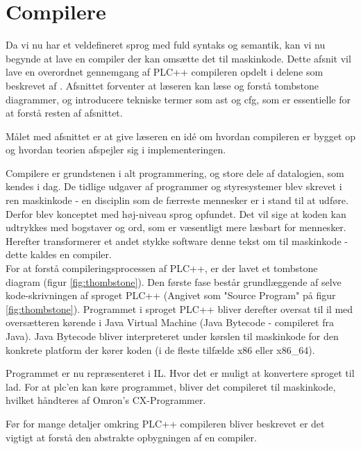 \section{Compilere}
Da vi nu har et veldefineret sprog med fuld syntaks og semantik, kan vi nu begynde at lave en compiler der kan omsætte det til maskinkode. Dette afsnit vil lave en overordnet gennemgang af PLC++ compileren opdelt i delene som beskrevet af \textcite{CraftingCompiler_2009}. 
Afsnittet forventer at læseren kan læse og forstå tombstone diagrammer, og introducere tekniske termer som \acrlong{ast} og \acrlong{cfg}, som er essentielle for at forstå resten af afsnittet. 

Målet med afsnittet er at give læseren en idé om hvordan compileren er bygget op og hvordan teorien afspejler sig i implementeringen.

\bigskip

\noindent Compilere er grundstenen i alt programmering, og store dele af datalogien, som kendes i dag. De tidlige udgaver af programmer og styresystemer blev skrevet i ren maskinkode - en disciplin som de færreste mennesker er i stand til at udføre. Derfor blev konceptet med høj-niveau sprog opfundet. Det vil sige at koden kan udtrykkes med bogstaver og ord, som er væsentligt mere læsbart for mennesker. Herefter transformerer et andet stykke software denne tekst om til maskinkode - dette kaldes en compiler. \\

\noindent For at forstå compileringsprocessen af PLC++, er der lavet et tombstone diagram (figur \ref{fig:thombstone}). Den første fase består grundlæggende af selve kode-skrivningen af sproget PLC++ (Angivet som "Source Program" på figur \ref{fig:thombstone}). Programmet i sproget PLC++ bliver derefter oversat til \gls{il} med oversætteren kørende i Java Virtual Machine (Java Bytecode - compileret fra Java). Java Bytecode bliver interpreteret under kørslen til maskinkode for den konkrete platform der kører koden (i de fleste tilfælde x86 eller x86\_64).

Programmet er nu repræsenteret i IL. Hvor det er muligt at konvertere sproget til \gls{lad}. For at \gls{plc}’en kan køre programmet, bliver det compileret til maskinkode, hvilket håndteres af Omron’s CX-Programmer.


Før for mange detaljer omkring PLC++ compileren bliver beskrevet er det vigtigt at forstå den abstrakte opbygningen af en compiler. %

